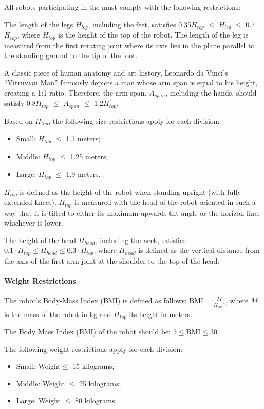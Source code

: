 All robots participating in the \leaguenameabbr must comply with the following restrictions:

The length of the legs $H_{leg}$, including the feet, satisfies 0.35{\textperiodcentered}$H_{top}$ ${\leq}$ $H_{leg}$ ${\leq}$ 0.7{\textperiodcentered}$H_{top}$,  where $H_{top}$ is the height of the top of the robot. 
The length of the leg is measured from the first rotating joint where its axis lies in the plane parallel to the standing ground to the tip of the foot.

A classic piece of human anatomy and art history, Leonardo da Vinci’s “Vitruvian Man” famously depicts a man whose arm span is equal to his height, creating a 1:1 ratio. 
Therefore, the arm span, $A_{span}$, including the hands, should satisfy 0.8{\textperiodcentered}$H_{top}$ ${\leq}$ $A_{span}$ ${\leq}$ 1.2{\textperiodcentered}$H_{top}$.

Based on $H_{top}$, the following size restrictions apply for each division:
%
\begin{itemize}
\item Small:  $H_{top}$ ${\leq}$ 1.1 meters;
\item Middle: $H_{top}$ ${\leq}$ 1.25 meters;
\item Large:  $H_{top}$ ${\leq}$ 1.9 meters.
\end{itemize}

$H_{top}$ is defined as the height of the robot when standing upright (with fully extended knees).
$H_{top}$ is measured with the head of the robot oriented in such a way that it
is tilted to either its maximum upwards tilt angle or the horizon line,
whichever is lower.

The height of the head $H_{head}$, including the neck, satisfies $0.1 \cdot H_{top} \leq H_{head} \leq 0.3 \cdot H_{top}$, where $H_{head}$ is defined as the vertical distance from the axis of the first arm joint at the shoulder to the top of the head.

\paragraph{Weight Restrictions}

The robot's Body-Mass Index (BMI) is defined as follows:
$\mathrm{BMI} = \frac{M}{{H_{top}}^2}$,
where $M$ is the mass of the robot in kg and $H_{top}$ its height in meters.

The Body Mass Index (BMI) of the robot should be: $5 \leq \mathrm{BMI} \leq 30$.

The following weight restrictions apply for each division:
%
\begin{itemize}
\item Small:  Weight${\leq}$ 15 kilograms;
\item Middle: Weight ${\leq}$ 25 kilograms;
\item Large:  Weight ${\leq}$ 80 kilograms.
\end{itemize}


